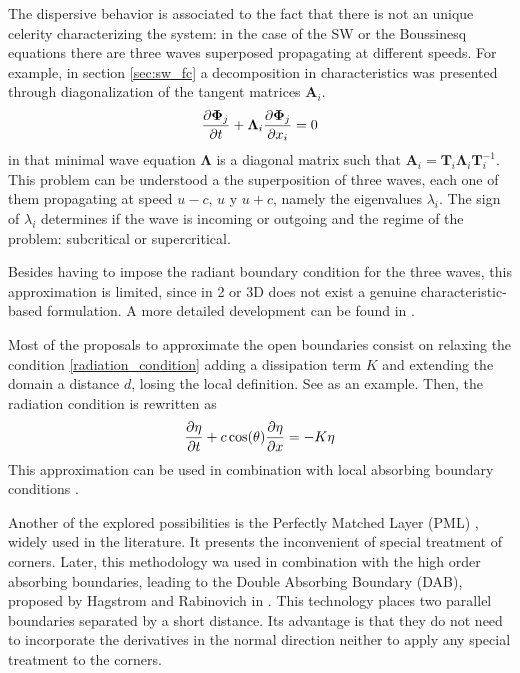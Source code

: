 The dispersive behavior is associated to the fact that there is not an unique celerity characterizing the system: in the case of the SW or the Boussinesq equations there are three waves superposed propagating at different speeds. For example, in section \ref{sec:sw_fc} a decomposition in characteristics was presented through diagonalization of the tangent matrices $\mathbf{A}_i$.
\begin{equation}
    \frac{\partial\bm\Phi_j}{\partial t} + \bm\Lambda_i \frac{\partial\bm\Phi_j}{\partial x_i} = 0
\end{equation}
in that minimal wave equation $\bm\Lambda$ is a diagonal matrix such that $\bm A_i = \bm T_i \bm\Lambda_i \bm T_i^{-1}$.
This problem can be understood a the superposition of three waves, each one of them propagating at speed $u-c$, $u$ y $u+c$, namely the eigenvalues $\lambda_i$. The sign of $\lambda_i$ determines if the wave is incoming or outgoing and the regime of the problem: subcritical or supercritical.

Besides having to impose the radiant boundary condition for the three waves, this approximation is limited, since in 2 or 3D does not exist a genuine characteristic-based formulation. A more detailed development can be found in \cite{lie2001}.

Most of the proposals to approximate the open boundaries consist on relaxing the condition \ref{radiation_condition}  adding a dissipation term $K$ and extending the domain a distance $d$, losing the local definition. See \cite{israeli1981,navon2004,carmigniani2018} as an example. Then, the radiation condition is rewritten as
\begin{equation} \label{radiation_absorbing_condition}
    \frac{\partial\eta}{\partial t} + c \cos(\theta)\frac{\partial\eta}{\partial x} = -K\eta
\end{equation}
This approximation can be used in combination with local absorbing boundary conditions \cite{wei1995}.

Another of the explored possibilities is the Perfectly Matched Layer (PML) \cite{berenger1994}, widely used in the literature. It presents the inconvenient of special treatment of corners.
Later, this methodology wa used in combination with the high order absorbing boundaries, leading to the Double Absorbing Boundary (DAB), proposed by Hagstrom and Rabinovich in \cite{hagstrom2014,rabinovich2015}. This technology places two parallel boundaries separated by a short distance. Its advantage is that they do not need to incorporate the derivatives in the normal direction neither to apply any special treatment to the corners.

